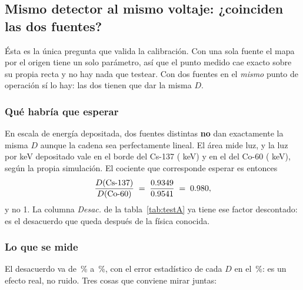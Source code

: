 \documentclass[11pt,a4paper]{article}
\begin{document}
\subsection{Mismo detector al mismo voltaje: ¿coinciden las dos fuentes?}
\label{sec:testA}

Ésta es la única pregunta que valida la calibración. Con una sola fuente el
mapa por el origen tiene un solo parámetro, así que el punto medido cae exacto
sobre su propia recta y no hay nada que testear. Con dos fuentes en el
\emph{mismo} punto de operación sí lo hay: las dos tienen que dar la misma
$D$.

\subsubsection{Qué habría que esperar}

En escala de energía depositada, dos fuentes distintas \textbf{no} dan
exactamente la misma $D$ aunque la cadena sea perfectamente lineal. El área
mide luz, y la luz por keV depositado vale \QuenchCs{} en el borde del Cs-137
(\BordeCs{} keV) y \QuenchCo{} en el del Co-60 (\BordeCoA{} keV), según la
propia simulación. El cociente que corresponde esperar es entonces
\[
   \frac{D(\text{Cs-137})}{D(\text{Co-60})}
   \;=\; \frac{0.9349}{0.9541} \;=\; 0.980,
\]
y no 1. La columna \emph{Desac.} de la tabla~\ref{tab:testA} ya tiene ese
factor descontado: es el desacuerdo que queda después de la física conocida.

\subsubsection{Lo que se mide}

\begin{table}[htbp]
\centering
\caption{Test de linealidad en cada punto de operación. $D$ conjunta es la media de las dos $D$ pesada por el inverso de su varianza (sección~\ref{sec:dconj}); el error de Cs/Co y del desacuerdo se propaga como en el apéndice~\ref{ap:propagacion}.}
\label{tab:testA}
{\small\setlength{\tabcolsep}{4.5pt}}
\end{table}

El desacuerdo va de \DesacMin\,\% a \DesacMax\,\%, con el error estadístico de
cada $D$ en el \ErrRelMediano\,\%: es un efecto real, no ruido. Tres cosas que
conviene mirar juntas:
\end{document}

